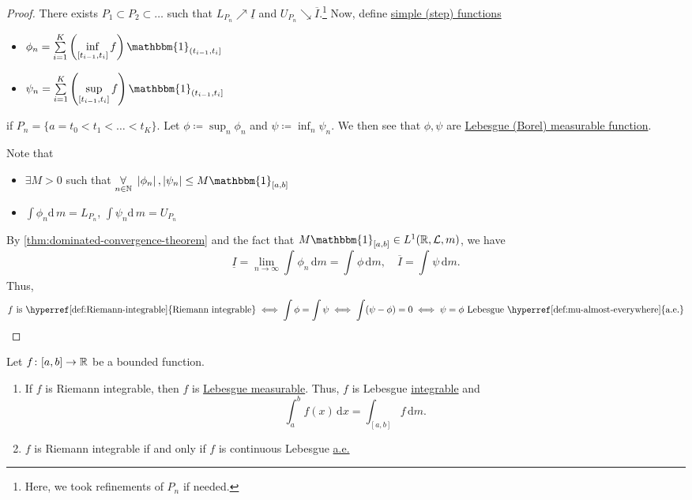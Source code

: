 \begin{proof}
	There exists \(P_1\subset P_2\subset \ldots  \) such that \(L_{P_{n}}\nearrow \underline{I} \) and \(U_{P_{n}}\searrow \overline{I} \).\footnote{Here, we took refinements of \(P_{n}\) if needed.}
	Now, define \hyperref[def:simple-function]{simple (step) functions}
	\begin{itemize}
		\item \(\phi _{n} = \sum\limits_{i=1}^{K} \left(\inf\limits_{[t_{i-1}, t_{i}]} f \right) \mathbbm{1}_{(t_{i-1}, t_{i}]} \)
		\item \(\psi _{n} = \sum\limits_{i=1}^{K} \left(\sup\limits_{[t_{i-1}, t_{i}]} f \right) \mathbbm{1}_{(t_{i-1}, t_{i}]} \)
	\end{itemize}
	if \(P_{n} = \{a = t_0 < t_1 < \ldots < t_{K} \}\). Let \(\phi \coloneqq \sup_n \phi _{n}\) and \(\psi \coloneqq \inf _n \psi _{n}\).
	We then see that \(\phi , \psi \) are \hyperref[def:measurable-function]{Lebesgue (Borel) measurable function}.
	\begin{note}
		Note that
		\begin{itemize}
			\item \(\exists M> 0\) such that \(\underset{n\in\mathbb{\MakeUppercase{n}} }{\forall }\ \left\vert \phi _{n} \right\vert, \left\vert \psi _{n} \right\vert \leq M\mathbbm{1}_{[a, b]} \)
			\item \(\int \phi _{n}\mathrm{d}\,m = L_{P_{n}}\), \(\int \psi _{n}\mathrm{d}\,m = U_{P_{n}}\)
		\end{itemize}
	\end{note}
	By \autoref{thm:dominated-convergence-theorem} and the fact that \(M\mathbbm{1}_{[a, b]} \in L^1(\mathbb{\MakeUppercase{r}} , \mathcal{\MakeUppercase{l}} , m) \),
	we have
	\[
		\underline{I} = \lim\limits_{n \to \infty} \int_{}^{} \phi _{n} \,\mathrm{d}m = \int_{}^{} \phi  \,\mathrm{d}m,\quad \overline{I}  = \int_{}^{} \psi  \,\mathrm{d}m.
	\]
	Thus,
	\[
		\begin{split}
			f \text{ is \hyperref[def:Riemann-integrable]{Riemann integrable}}
			\iff  \int \phi = \int \psi
			\iff  \int (\psi - \phi ) = 0
			\iff  \psi = \phi \text{ Lebesgue \hyperref[def:mu-almost-everywhere]{a.e.}}
		\end{split}
	\]

\end{proof}

\begin{theorem}
	Let \(f\colon [a, b]\to \mathbb{\MakeUppercase{r}} \) be a bounded function.
	\begin{enumerate}
		\item If \(f\) is Riemann integrable, then \(f\) is \hyperref[def:Lebesgue-measurable-function]{Lebesgue measurable}.
		      Thus, \(f\) is Lebesgue \hyperref[def:integrable]{integrable} and
		      \[
			      \int_{a}^{b} f(x) \,\mathrm{d}x = \int_{[a, b]}f  \,\mathrm{d}m.
		      \]
		\item \(f\) is Riemann integrable if and only if \(f\) is continuous Lebesgue \hyperref[def:mu-almost-everywhere]{a.e.}
	\end{enumerate}
\end{theorem}


